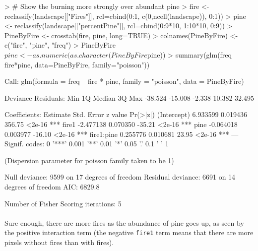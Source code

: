 \documentclass{article}
\begin{document}
\begin{Schunk}
\begin{Sinput}
> # Show the burning more strongly over abundant pine
> fire <- reclassify(landscape[["Fires"]], rcl=cbind(0:1, c(0,ncell(landscape)), 0:1))
> pine <- reclassify(landscape[["percentPine"]], rcl=cbind(0:9*10, 1:10*10, 0:9))
> PineByFire <- crosstab(fire, pine, long=TRUE)
> colnames(PineByFire) <- c("fire", "pine", "freq")
> PineByFire$pine <- as.numeric(as.character(PineByFire$pine))
> summary(glm(freq ~ fire*pine, data=PineByFire, family="poisson"))
\end{Sinput}
\begin{Soutput}
Call:
glm(formula = freq ~ fire * pine, family = "poisson", data = PineByFire)

Deviance Residuals:
    Min       1Q   Median       3Q      Max
-38.524  -15.008   -2.338   10.382   32.495

Coefficients:
             Estimate Std. Error z value Pr(>|z|)
(Intercept)  6.933599   0.019436  356.75   <2e-16 ***
fire1       -2.477138   0.070350  -35.21   <2e-16 ***
pine        -0.064018   0.003977  -16.10   <2e-16 ***
fire1:pine   0.255776   0.010681   23.95   <2e-16 ***
---
Signif. codes:  0 '***' 0.001 '**' 0.01 '*' 0.05 '.' 0.1 ' ' 1

(Dispersion parameter for poisson family taken to be 1)

    Null deviance: 9599  on 17  degrees of freedom
Residual deviance: 6691  on 14  degrees of freedom
AIC: 6829.8

Number of Fisher Scoring iterations: 5
\end{Soutput}
\end{Schunk}

\paragraph{}
Sure enough, there are more fires as the abundance of pine goes up, as seen by the positive interaction term (the negative \texttt{fire1} term means that there are more pixels without fires than with fires).
\end{document}
